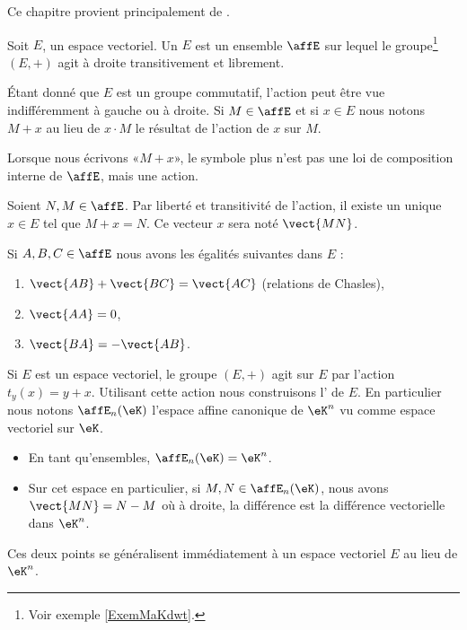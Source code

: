 
Ce chapitre provient principalement de \cite{Combes}.

\begin{definition}
    Soit \( E\), un espace vectoriel. Un  \( E\) est un ensemble \( \affE\) sur lequel le groupe\footnote{Voir exemple \ref{ExemMaKdwt}.} \( (E,+)\) agit à droite transitivement et librement.
\end{definition}

Étant donné que \( E\) est un groupe commutatif, l'action peut être vue indifféremment à gauche ou à droite. Si \( M\in\affE\) et si \( x\in E\) nous notons \( M+x\) au lieu de \( x\cdot M\) le résultat de l'action de \( x\) sur \( M\).

\begin{normaltext}      \label{NORMooZANAooQdXqlh}
    Lorsque nous écrivons «\( M+x\)», le symbole plus n'est pas une loi de composition interne de \( \affE\), mais une action.

    Soient \( N,M\in\affE\). Par liberté et transitivité de l'action, il existe un unique \( x\in E\) tel que \( M+x=N\). Ce vecteur \( x\) sera noté \( \vect{ MN }\).
\end{normaltext}

\begin{proposition}     \label{PROPooCOZCooCghwaR}
    Si \( A,B,C\in\affE\) nous avons les égalités suivantes dans \( E\) :
    \begin{enumerate}
        \item   \label{ITEMooSDMIooUQiKeW}
            \( \vect{ AB }+\vect{ BC }=\vect{ AC }\) (relations de Chasles),
        \item
            \( \vect{ AA }=0\),
        \item
            \( \vect{ BA }=-\vect{ AB }\).
    \end{enumerate}
\end{proposition}

\begin{normaltext}      \label{NORMooXAJLooIupekj}
    Si \( E\) est un espace vectoriel, le groupe \( (E,+)\) agit sur \( E\) par l'action \( t_y(x)=y+x\). Utilisant cette action nous construisons l' de \( E\). En particulier nous notons \( \affE_n(\eK)\) l'espace affine canonique de \( \eK^n\) vu comme espace vectoriel sur \( \eK\).
    \begin{itemize}
        \item 
            En tant qu'ensembles, \( \affE_n(\eK)=\eK^n\).
        \item
            Sur cet espace en particulier, si \( M,N\in\affE_n(\eK)\), nous avons \( \vect{ MN }=N-M\) où à droite, la différence est la différence vectorielle dans \(\eK^n\).
    \end{itemize}

    Ces deux points se généralisent immédiatement à un espace vectoriel \( E\) au lieu de \( \eK^n\).
\end{normaltext}


